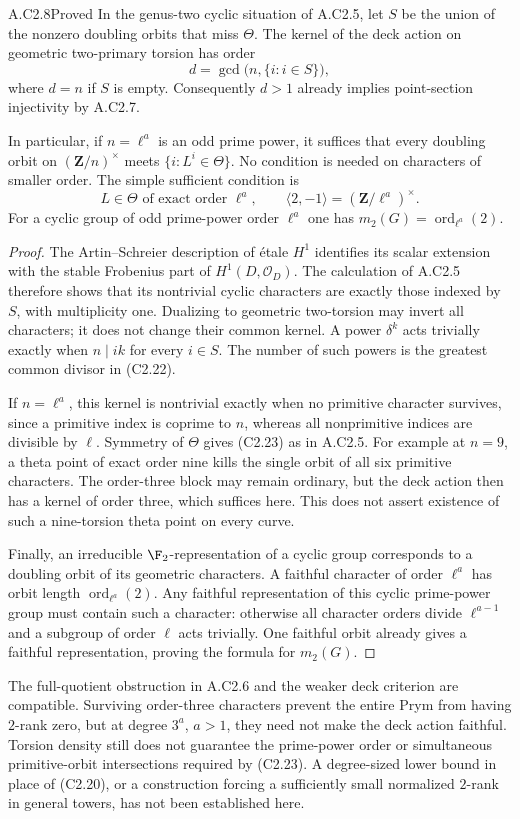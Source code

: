 \begin{claim}{A.C2.8}{Proved}
In the genus-two cyclic situation of A.C2.5, let $S$ be the
union of the nonzero doubling orbits that miss $\Theta$.
The kernel of the deck action on geometric two-primary torsion
has order
\[
                    d=\gcd\bigl(n,\{i:i\in S\}\bigr),        \tag{C2.22}
\]
where $d=n$ if $S$ is empty. Consequently $d>1$ already implies
point-section injectivity by A.C2.7.

In particular, if $n=\ell^a$ is an odd prime power, it suffices
that every doubling orbit on $(\mathbf Z/n)^\times$ meets
$\{i:L^i\in\Theta\}$. No condition is needed on characters
of smaller order. The simple sufficient condition is
\[
 L\in\Theta\text{ of exact order }\ell^a,\qquad
                 \langle2,-1\rangle=(\mathbf Z/\ell^a)^\times.
                                                               \tag{C2.23}
\]
For a cyclic group of odd prime-power order $\ell^a$ one has
$m_2(G)=\operatorname{ord}_{\ell^a}(2)$.
\end{claim}
\begin{proof}
The Artin--Schreier description of \'etale $H^1$ identifies its
scalar extension with the stable Frobenius part of
$H^1(D,\mathcal O_D)$. The calculation of A.C2.5 therefore
shows that its nontrivial cyclic characters are exactly those
indexed by $S$, with multiplicity one. Dualizing to geometric
two-torsion may invert all characters; it does not change
their common kernel. A power $\delta^k$ acts trivially exactly
when $n\mid ik$ for every $i\in S$. The number of such powers
is the greatest common divisor in (C2.22).

If $n=\ell^a$, this kernel is nontrivial exactly when no
primitive character survives, since a primitive index is
coprime to $n$, whereas all nonprimitive indices are divisible
by $\ell$. Symmetry of $\Theta$ gives (C2.23) as in A.C2.5.
For example at $n=9$, a theta point of exact order nine kills
the single orbit of all six primitive characters. The
order-three block may remain ordinary, but the deck action
then has a kernel of order three, which suffices here. This
does not assert existence of such a nine-torsion theta point
on every curve.

Finally, an irreducible $\F_2$-representation of a cyclic
group corresponds to a doubling orbit of its geometric
characters. A faithful character of order $\ell^a$ has orbit
length $\operatorname{ord}_{\ell^a}(2)$. Any faithful
representation of this cyclic prime-power group must contain
such a character: otherwise all character orders divide
$\ell^{a-1}$ and a subgroup of order $\ell$ acts trivially.
One faithful orbit already gives a faithful representation,
proving the formula for $m_2(G)$.
\end{proof}

The full-quotient obstruction in A.C2.6 and the weaker deck
criterion are compatible. Surviving order-three characters
prevent the entire Prym from having $2$-rank zero, but at
degree $3^a$, $a>1$, they need not make the deck action
faithful. Torsion density still does not guarantee the
prime-power order or simultaneous primitive-orbit
intersections required by (C2.23). A degree-sized lower
bound in place of (C2.20), or a construction forcing a
sufficiently small normalized $2$-rank in general towers,
has not been established here.
